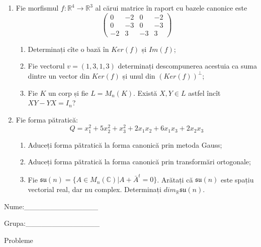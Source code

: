\documentclass{article}
\begin{document}
\begin{enumerate}
 \item Fie morfismul $f:\mathbb{R}^4 \to \mathbb{R}^3$ al cărui matrice în raport cu bazele canonice este
$$\begin{pmatrix}
0&-2&0&-2\\
0&-3&0&-3\\
-2&3&-3&3
\end{pmatrix}$$

\begin{enumerate}
\item Determinați cîte o bază în $Ker(f)$ și $Im(f)$;
\item Fie vectorul $v=(1,3,1,3)$ determinați descompunerea acestuia ca suma dintre un vector din $Ker(f)$ și unul din $(Ker(f))^\perp$;
\item Fie $K$ un corp și fie $L=M_n(K)$. Există $X,Y \in L$ astfel încît $XY-YX=I_n$?  
\end{enumerate}
\item Fie forma pătratică:
$$Q= x_1^2+5x_2^2+x_3^2+2x_1x_2+6x_1x_3+2x_2x_3$$

\begin{enumerate}
\item Aduceți forma pătratică la forma canonică prin metoda Gauss;
\item Aduceți forma pătratică la forma canonică prin transformări ortogonale;
\item Fie $\mathfrak{su}(n)=\{ A \in M_n(\mathbb{C}) | A+\bar{A}^t=0\}$. Arătați că $\mathfrak{su}(n)$ este spațiu vectorial real, dar nu complex.
Determinați $dim_{\mathbb{R}}\mathfrak{su}(n)$.
\end{enumerate}
\end{enumerate}
\newpage
\begin{flushright}
Nume:\_\_\_\_\_\_\_\_\_\_\_\_\_\_
 
 
Grupa:\_\_\_\_\_\_\_\_\_\_\_\_\_\_
\end{flushright}
\begin{center}
\vspace{2cm}
{\Large Probleme}
\vspace{2cm}
\end{center}
\end{document}
